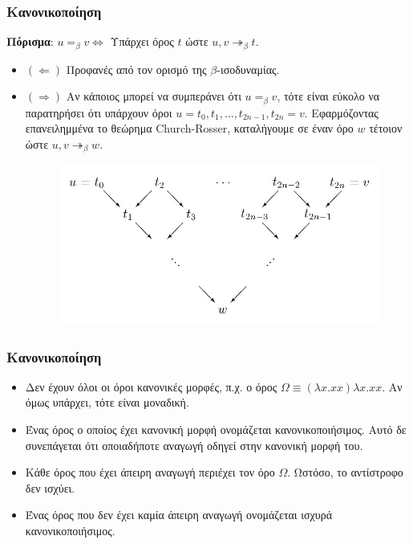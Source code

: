 \documentclass{beamer}
\begin{document}
\begin{frame}
  \frametitle{Κανονικοποίηση}
  \textbf{Πόρισμα}: $u =_\beta v \Leftrightarrow$ Υπάρχει όρος $t$
  ώστε $u, v \twoheadrightarrow _\beta t$.
  \begin{itemize}
  \item $(\Leftarrow)$ Προφανές από τον ορισμό της $\beta$-ισοδυναμίας.
  \item $(\Rightarrow)$ Aν κάποιος μπορεί να συμπεράνει ότι $u =_\beta v$,
    τότε είναι εύκολο να παρατηρήσει ότι υπάρχουν όροι $u = t_0,
    t_1,\ldots, t_{2n-1}, t_{2n} = v$. Εφαρμόζοντας επανειλημμένα το
    θεώρημα Church-Rosser, καταλήγουμε σε έναν όρο $w$ τέτοιον ώστε
    $u, v \twoheadrightarrow _\beta w$.
    \begin{figure} [!ht]
      \centering
      \includegraphics[scale=0.3] {CR1.jpg}
    \end{figure}
  \end{itemize}
\end{frame}

\begin{frame}
  \frametitle{Κανονικοποίηση}
  \begin{itemize}
  \item Δεν έχουν όλοι οι όροι κανονικές μορφές, π.χ. ο όρος $\Omega
    \equiv (\lambda x . xx) \lambda x . xx$. Αν όμως υπάρχει, τότε
    είναι μοναδική.
  \item Ένας όρος ο οποίος έχει κανονική μορφή ονομάζεται
    κανονικοποιήσιμος. Αυτό δε συνεπάγεται ότι οποιαδήποτε αναγωγή
    οδηγεί στην κανονική μορφή του.
  \item Κάθε όρος που έχει άπειρη αναγωγή περιέχει τον όρο
    $\Omega$. Ωστόσο, το αντίστροφο δεν ισχύει.
  \item Ένας όρος που δεν έχει καμία άπειρη αναγωγή ονομάζεται ισχυρά
    κανονικοποιήσιμος.
  \end{itemize}
\end{frame}
\end{document}
